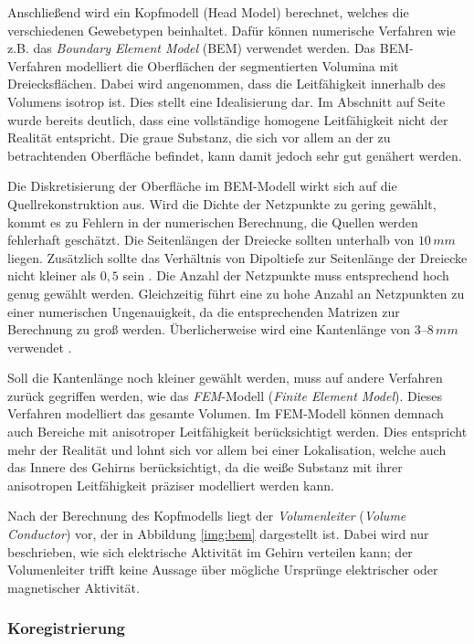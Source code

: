 \documentclass[doc,a4paper,12pt]{apa6}
\makeatletter
\DeclareRobustCommand*{\nameref}[1]{%
      \glqq{\myorg@nameref{#1}}\grqq%
    }%
\makeatother
\begin{document}
Anschließend wird ein Kopfmodell (Head Model) berechnet, welches die verschiedenen Gewebetypen beinhaltet. Dafür können numerische Verfahren wie z.B. das \emph{Boundary Element Model} (BEM) verwendet werden. Das BEM-Verfahren modelliert die Oberflächen der segmentierten Volumina mit Dreiecksflächen. Dabei wird angenommen, dass die Leitfähigkeit innerhalb des Volumens isotrop ist. Dies stellt eine Idealisierung dar. Im Abschnitt \nameref{sec:head-struct} auf Seite \pageref{sec:head-struct} wurde bereits deutlich, dass eine vollständige homogene Leitfähigkeit nicht der Realität entspricht. Die graue Substanz, die sich vor allem an der zu betrachtenden Oberfläche befindet, kann damit jedoch sehr gut genähert werden.

Die Diskretisierung der Oberfläche im BEM-Modell wirkt sich auf die Quellrekonstruktion aus. Wird die Dichte der Netzpunkte zu gering gewählt, kommt es zu Fehlern in der numerischen Berechnung, die Quellen werden fehlerhaft geschätzt. Die Seitenlängen der Dreiecke sollten unterhalb von $10\,mm$ liegen. Zusätzlich sollte das Verhältnis von Dipoltiefe zur Seitenlänge der Dreiecke nicht kleiner als $0,5$ sein \parencite{haueisen1997effect}. Die Anzahl der Netzpunkte muss entsprechend hoch genug gewählt werden. Gleichzeitig führt eine zu hohe Anzahl an Netzpunkten zu einer numerischen Ungenauigkeit, da die entsprechenden Matrizen zur Berechnung zu groß werden. Überlicherweise wird eine Kantenlänge von $3$--$8\,mm$ verwendet \parencite[z.B.][]{haueisen2002evaluation,tarkiainen20033d}.

Soll die Kantenlänge noch kleiner gewählt werden, muss auf andere Verfahren zurück gegriffen werden, wie das \emph{FEM}-Modell (\emph{Finite Element Model}). Dieses Verfahren modelliert das gesamte Volumen. Im FEM-Modell können demnach auch Bereiche mit anisotroper Leitfähigkeit berücksichtigt werden. Dies entspricht mehr der Realität und lohnt sich vor allem bei einer Lokalisation, welche auch das Innere des Gehirns berücksichtigt, da die weiße Substanz mit ihrer anisotropen Leitfähigkeit präziser modelliert werden kann.

Nach der Berechnung des Kopfmodells liegt der \emph{Volumenleiter} (\emph{Volume Conductor}) vor, der in Abbildung \ref{img:bem} dargestellt ist. Dabei wird nur beschrieben, wie sich elektrische Aktivität im Gehirn verteilen kann; der Volumenleiter trifft keine Aussage über mögliche Ursprünge elektrischer oder magnetischer Aktivität.

\subsubsection{Koregistrierung}
\label{sec:coreg}
\end{document}
